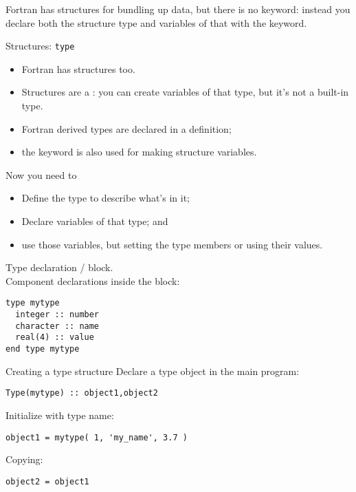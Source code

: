 
Fortran has structures for bundling up data, but there is no
 keyword: instead you declare both the structure type and
variables of that  with the 
 keyword. 

\begin{slide}{Structures: \noexpand\texttt{type}}
  \label{sl:ftype}
  \begin{itemize}
  \item Fortran has structures too.
  \item Structures are a : you can create
    variables of that type, but it's not a built-in type.
  \item  Fortran derived types are declared in a 
    definition;
  \item the  keyword is also used for making
    structure variables.    
  \end{itemize}
\end{slide}

Now you need to
\begin{itemize}
\item Define the type to describe what's in it;
\item Declare variables of that type; and
\item use those variables, but setting the type members or using their
  values.
\end{itemize}

\begin{block}{Type declaration}
  \label{sl:ftype-def}
   /  block.\\
  Component declarations inside the block:
\begin{lstlisting}
type mytype
  integer :: number
  character :: name
  real(4) :: value
end type mytype
\end{lstlisting}
\end{block}

\begin{block}{Creating a type structure}
  \label{sl:ftype-set}
  Declare a type object in the main program:
\begin{lstlisting}
Type(mytype) :: object1,object2
\end{lstlisting}
 Initialize with type name:
\begin{lstlisting}
object1 = mytype( 1, 'my_name', 3.7 )
\end{lstlisting}
Copying:
\begin{lstlisting}
object2 = object1
\end{lstlisting}

\end{block}

